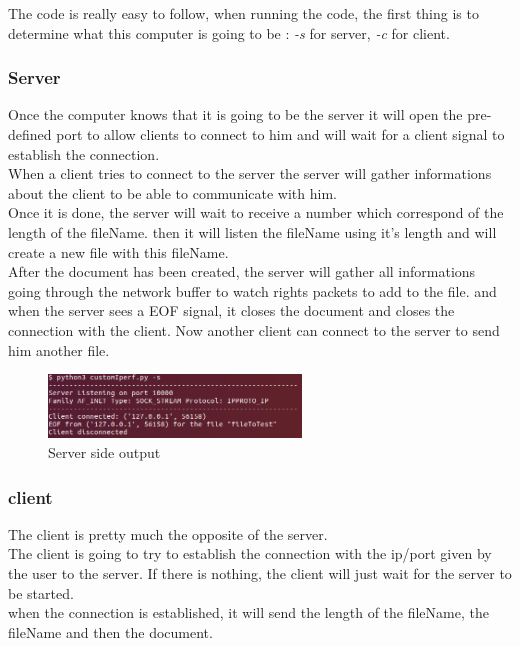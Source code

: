 \documentclass[a4paper]{article}
\begin{document}
The code is really easy to follow, when running the code, the first thing is to determine what this computer is going to be : \textit{-s} for server, \textit{-c} for client.


\subsubsection*{Server}

Once the computer knows that it is going to be the server it will open the pre-defined port to allow clients to connect to him and will wait for a client signal to establish the connection.\\
When a client tries to connect to the server the server will gather informations about the client to be able to communicate with him.\\
Once it is done, the server will wait to receive a number which correspond of the length of the fileName. then it will listen the fileName using it's length and will create a new file with this fileName.\\
After the document has been created, the server will gather all informations going through the network buffer to watch rights packets to add to the file. and when the server sees a EOF signal, it closes the document and closes the connection with the client.
Now another client can connect to the server to send him another file.

\begin{figure}[H]
\centering
\includegraphics[width=0.6\textwidth]{serverSide.png}
\caption{Server side output}
\end{figure}

\subsubsection*{client}

The client is pretty much the opposite of the server.\\
The client is going to try to establish the connection with the ip/port given by the user to the server. If there is nothing, the client will just wait for the server to be started.\\
when the connection is established, it will send the length of the fileName, the fileName and then the document.
\end{document}
